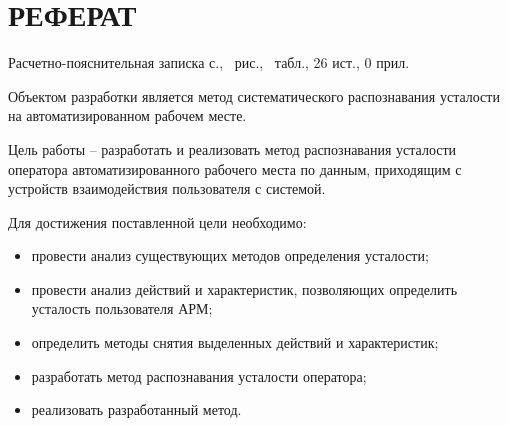 \section*{РЕФЕРАТ}

Расчетно-пояснительная записка \pageref{LastPage} с., \totalfigures\ рис., \totaltables\ табл., 26 ист., 0 прил.

Объектом разработки является метод систематического распознавания усталости на автоматизированном рабочем месте.

Цель работы -- разработать и реализовать метод распознавания усталости оператора автоматизированного рабочего места по данным, приходящим с устройств взаимодействия пользователя с системой.

Для достижения поставленной цели необходимо:
\begin{itemize}
\item провести анализ существующих методов определения усталости;
\item провести анализ действий и характеристик, позволяющих определить усталость пользователя АРМ;
\item определить методы снятия выделенных действий и характеристик;
\item разработать метод распознавания усталости оператора;
\item реализовать разработанный метод.
\end{itemize}

\pagebreak